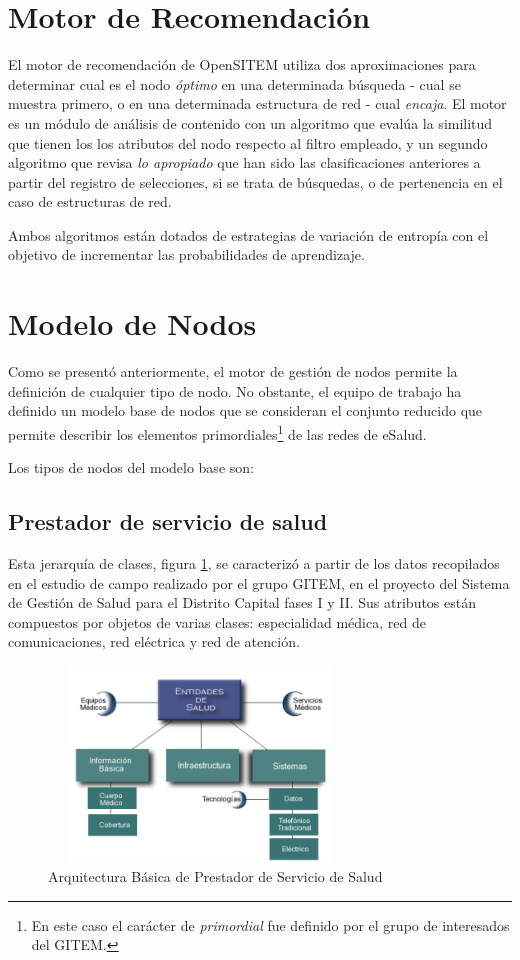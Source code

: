\section{Motor de Recomendación}

El motor de recomendación de OpenSITEM utiliza dos aproximaciones para determinar cual es el nodo \textit{óptimo} en una determinada búsqueda - cual se muestra primero, o en una determinada estructura de red - cual \textit{encaja}. El motor es un módulo de análisis de contenido con un algoritmo que  evalúa la similitud que tienen los los atributos del nodo respecto al filtro empleado, y un segundo algoritmo que revisa \textit{lo apropiado} que han sido las clasificaciones anteriores a partir del registro de selecciones, si se trata de búsquedas, o de pertenencia en el caso de estructuras de red.

Ambos algoritmos están dotados de estrategias de variación de entropía con el objetivo de incrementar las probabilidades de aprendizaje. 


\section{Modelo de Nodos}

Como se presentó anteriormente, el motor de gestión de nodos permite la definición de cualquier tipo de nodo. No obstante, el equipo de trabajo ha definido un modelo base de nodos que se consideran el conjunto reducido que permite describir los elementos primordiales\footnote{En este caso el carácter de \textit{primordial} fue definido por el grupo de interesados del GITEM.} de las redes de eSalud.

Los tipos de nodos del modelo base son:

\subsection{Prestador de servicio de salud} 
Esta jerarquía de clases, figura \ref{entidades}, se caracterizó a partir de los datos recopilados en el estudio de campo realizado por el grupo GITEM, en el proyecto del Sistema de Gestión de Salud para el Distrito Capital fases I y II. Sus atributos están compuestos por objetos de varias clases: especialidad médica, red de comunicaciones, red eléctrica y red de atención.

\begin{figure}
 \centering
 \includegraphics[width=80mm, height=52mm]{entidades.png}
 \caption{Arquitectura Básica de Prestador de Servicio de Salud}
\label{entidades}
\end{figure}

